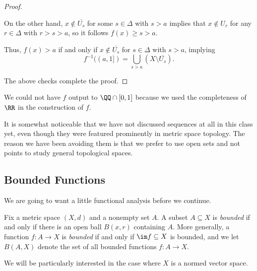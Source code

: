 \documentclass[../notes.tex]{subfiles}
\begin{document}
\begin{proof}
\begin{itemize}
\begin{itemize}
			On the other hand, $x\notin\overline{U_s}$ for some $s\in\Delta$ with $s>a$ implies that $x\notin U_r$ for any $r\in\Delta$ with $r>s>a$, so it follows $f(x)\ge s>a$.

			Thus, $f(x)>a$ if and only if $x\notin\overline{U_s}$ for $s\in\Delta$ with $s>a$, implying
			\[f^{-1}((a,1])=\bigcup_{s>a}(X\setminus\overline{U_s}).\]
		\end{itemize}
	\end{itemize}
	The above checks complete the proof.
\end{proof}
\begin{remark}
	We could not have $f$ output to $\QQ\cap[0,1]$ because we used the completeness of $\RR$ in the construction of $f$.
\end{remark}
\begin{remark}
	It is somewhat noticeable that we have not discussed sequences at all in this class yet, even though they were featured prominently in metric space topology. The reason we have been avoiding them is that we prefer to use open sets and not points to study general topological spaces.
\end{remark}

\subsection{Bounded Functions}
We are going to want a little functional analysis before we continue.
\begin{definition}[Bounded]
	Fix a metric space $(X,d)$ and a nonempty set $A$. A subset $A\subseteq X$ is \textit{bounded} if and only if there is an open ball $B(x,r)$ containing $A$. More generally, a function $f\colon A\to X$ is \textit{bounded} if and only if $\im f\subseteq X$ is bounded, and we let $B(A,X)$ denote the set of all bounded functions $f\colon A\to X$.
\end{definition}
We will be particularly interested in the case where $X$ is a normed vector space.
\end{document}

